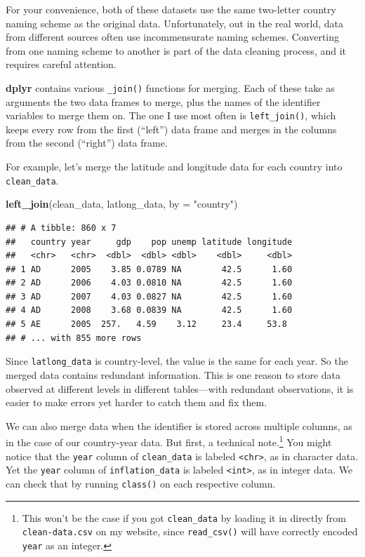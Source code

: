 \documentclass[
  12pt,
  oneside,openany]{book}
\newenvironment{Shaded}{\begin{snugshade}}{\end{snugshade}}
\newcommand{\DataTypeTok}[1]{\textcolor[rgb]{0.13,0.29,0.53}{#1}}
\newcommand{\KeywordTok}[1]{\textcolor[rgb]{0.13,0.29,0.53}{\textbf{#1}}}
\newcommand{\NormalTok}[1]{#1}
\newcommand{\StringTok}[1]{\textcolor[rgb]{0.31,0.60,0.02}{#1}}
\begin{document}
For your convenience, both of these datasets use the same two-letter country naming scheme as the original data. Unfortunately, out in the real world, data from different sources often use incommensurate naming schemes. Converting from one naming scheme to another is part of the data cleaning process, and it requires careful attention.

\textbf{dplyr} contains various \texttt{\_join()} functions for merging. Each of these take as arguments the two data frames to merge, plus the names of the identifier variables to merge them on. The one I use most often is \texttt{left\_join()}, which keeps every row from the first (``left'') data frame and merges in the columns from the second (``right'') data frame.

For example, let's merge the latitude and longitude data for each country into \texttt{clean\_data}.

\begin{Shaded}
\begin{Highlighting}[]
\KeywordTok{left\_join}\NormalTok{(clean\_data,}
\NormalTok{          latlong\_data,}
          \DataTypeTok{by =} \StringTok{"country"}\NormalTok{)}
\end{Highlighting}
\end{Shaded}

\begin{verbatim}
## # A tibble: 860 x 7
##   country year     gdp    pop unemp latitude longitude
##   <chr>   <chr>  <dbl>  <dbl> <dbl>    <dbl>     <dbl>
## 1 AD      2005    3.85 0.0789 NA        42.5      1.60
## 2 AD      2006    4.03 0.0810 NA        42.5      1.60
## 3 AD      2007    4.03 0.0827 NA        42.5      1.60
## 4 AD      2008    3.68 0.0839 NA        42.5      1.60
## 5 AE      2005  257.   4.59    3.12     23.4     53.8 
## # ... with 855 more rows
\end{verbatim}

Since \texttt{latlong\_data} is country-level, the value is the same for each year. So the merged data contains redundant information. This is one reason to store data observed at different levels in different tables---with redundant observations, it is easier to make errors yet harder to catch them and fix them.

We can also merge data when the identifier is stored across multiple columns, as in the case of our country-year data. But first, a technical note.\footnote{This won't be the case if you got \texttt{clean\_data} by loading it in directly from \texttt{clean-data.csv} on my website, since \texttt{read\_csv()} will have correctly encoded \texttt{year} as an integer.} You might notice that the \texttt{year} column of \texttt{clean\_data} is labeled \texttt{\textless{}chr\textgreater{}}, as in character data. Yet the \texttt{year} column of \texttt{inflation\_data} is labeled \texttt{\textless{}int\textgreater{}}, as in integer data. We can check that by running \texttt{class()} on each respective column.
\end{document}
